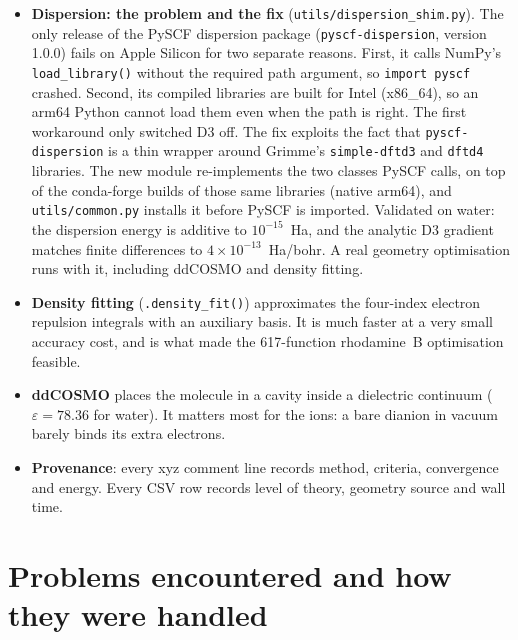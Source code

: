 \documentclass[11pt,a4paper]{article}
\begin{document}
\begin{itemize}
  \item \textbf{Dispersion: the problem and the fix} (\texttt{utils/\allowbreak dispersion\_\allowbreak shim.py}).
  The only release of the PySCF dispersion package (\texttt{pyscf-dispersion}, version 1.0.0) fails on
  Apple Silicon for two separate reasons.
  First, it calls NumPy's \texttt{load\_library()} without the required path argument, so
  \texttt{import pyscf} crashed. Second, its compiled libraries are built for Intel (x86\_64), so an
  arm64 Python cannot load them even when the path is right. The first workaround only switched D3 off.
  The fix exploits the fact that \texttt{pyscf-dispersion} is a thin wrapper around Grimme's
  \texttt{simple-dftd3} and \texttt{dftd4} libraries. The new module re-implements the two classes PySCF
  calls, on top of the conda-forge builds of those same libraries (native arm64), and
  \texttt{utils/common.py} installs it before PySCF is imported. Validated on water: the dispersion energy
  is additive to $10^{-15}$~Ha, and the analytic D3 gradient matches finite differences to
  $4\times10^{-13}$~Ha/bohr. A real geometry optimisation runs with it, including ddCOSMO and density
  fitting.
  \item \textbf{Density fitting} (\texttt{.density\_fit()}) approximates the four-index electron
  repulsion integrals with an auxiliary basis. It is much faster at a very small accuracy cost,
  and is what made the 617-function rhodamine~B optimisation feasible.
  \item \textbf{ddCOSMO} places the molecule in a cavity inside a dielectric continuum
  ($\varepsilon=78.36$ for water). It matters most for the ions: a bare dianion in vacuum barely
  binds its extra electrons.
  \item \textbf{Provenance}: every xyz comment line records method, criteria, convergence and
  energy. Every CSV row records level of theory, geometry source and wall time.
\end{itemize}

\section{Problems encountered and how they were handled}
\end{document}
